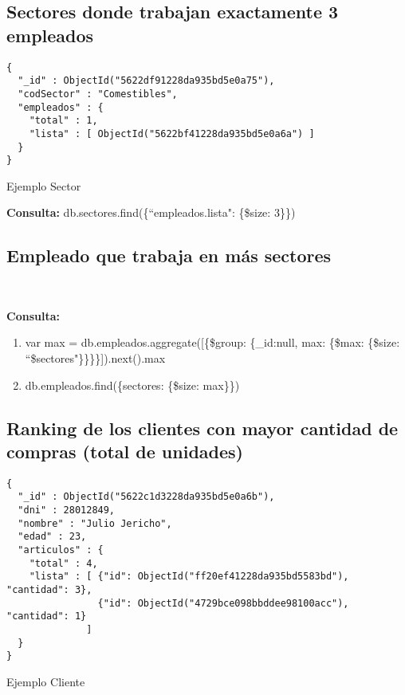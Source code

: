 \vspace{3em}

\subsection{Sectores donde trabajan exactamente 3 empleados}
\begin{listing}
\begin{verbatim}
{
  "_id" : ObjectId("5622df91228da935bd5e0a75"),
  "codSector" : "Comestibles",
  "empleados" : {
    "total" : 1,
    "lista" : [ ObjectId("5622bf41228da935bd5e0a6a") ]
  }
}
\end{verbatim}
\caption{Ejemplo Sector}
\label{json-example}
\end{listing}

\textbf{Consulta: } db.sectores.find(\{``empleados.lista": \{\$size: 3\}\})

\vspace{3em}

\subsection{Empleado que trabaja en más sectores}

\

\textbf{Consulta: }

\begin{enumerate}
  \item var max = db.empleados.aggregate([\{\$group: \{\_id:null, max: \{\$max: \{\$size: ``\$sectores"\}\}\}\}]).next().max
  \item db.empleados.find(\{sectores: \{\$size: max\}\})
\end{enumerate}

\vspace{3em}

\subsection{Ranking de los clientes con mayor cantidad de compras (total de unidades)}

\begin{listing}
\begin{verbatim}
{
  "_id" : ObjectId("5622c1d3228da935bd5e0a6b"),
  "dni" : 28012849,
  "nombre" : "Julio Jericho",
  "edad" : 23,
  "articulos" : {
    "total" : 4,
    "lista" : [ {"id": ObjectId("ff20ef41228da935bd5583bd"), "cantidad": 3},
                {"id": ObjectId("4729bce098bbddee98100acc"), "cantidad": 1}
              ]
  }
}

\end{verbatim}
\caption{Ejemplo Cliente}
\label{json-example}
\end{listing}


